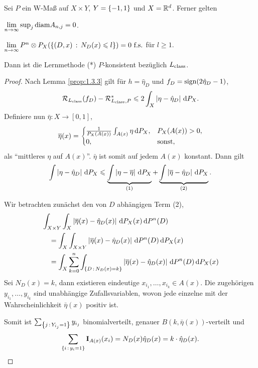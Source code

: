 \begin{prop}
\label{prop:1.3.4}
Sei $P$ ein W-Maß auf $X\times Y$, $Y=\left\{ -1,1 \right\}$ und $X=\mathbb{R}^d$. Ferner gelten
\begin{propenum}
\item $\lim\limits_{n\to\infty} \sup_j \mathrm{diam} A_{n,j} = 0$.
\item $\lim\limits_{n\to\infty} P^n\otimes P_X(\left\{ (D,x)\,:\,N_D(x)\leqslant l\right\}) =
0\ \text{f.s.}$ für $l\ge 1$.
\end{propenum}
Dann ist die Lernmethode (*) $P$-konsistent bezüglich $L_{\mathrm{class}}$.\fishhere
\end{prop}
\begin{proof}
Nach Lemma \ref{prop:1.3.3} gilt für $h=\hat{\eta}_D$ und
$f_D=\operatorname{sign}(2\hat{\eta}_D-1)$,
\begin{align*}
\mathcal{R}_{L_{\mathrm{class}}}(f_D) - \mathcal{R}_{L_{\mathrm{class}},P}^*
\leqslant 2\int_X \left|\eta-\hat\eta_D\right|\,\mathrm{d} P_X.
\end{align*}
Definiere nun $\bar{\eta}:X\to[0,1]$,
\begin{align*}
{\overline{\eta}}(x) =
\begin{cases}
\frac{1}{P_X(A(x))}\int_{A(x)} \eta \,\mathrm{d} P_X, & P_X(A(x)) > 0,\\
0, & \text{sonst},
\end{cases}
\end{align*}
als ``mittleres $\eta$ auf $A(x)$''. $\bar{\eta}$ ist somit auf jedem $A(x)$
konstant.
Dann gilt
\begin{align*}
\int \left|\eta-\hat{\eta}_D\right|\,\mathrm{d} P_X \leqslant
\underbrace{\int\left|\eta-{\overline{\eta}}\right|\,\mathrm{d} P_X}_{(1)}
+ \underbrace{\int \left|{\overline{\eta}}-\hat{\eta}_D\right|\,\mathrm{d} P_X}_{(2)}.
\end{align*}

Wir betrachten zunächst den von $D$ abhängigen Term (2),
\begin{align*}
&\int_{X\times Y} \int_X \left|{\overline{\eta}}(x)-\hat{\eta}_D(x)\right|\,\mathrm{d} P_X(x)\,\mathrm{d} P^n(D)\\
&\quad =
 \int_X\int_{X\times Y} \left|{\overline{\eta}}(x)-\hat{\eta}_D(x)\right|\,\mathrm{d} P^n(D)\,\mathrm{d} P_X(x)\\
&\quad=
 \int_X\sum_{k=0}^n \int_{\left\{ D\,:\,N_D(x)=k\right\}}
 \left|{\overline{\eta}}(x)-\hat{\eta}_D(x)\right|\,\mathrm{d} P^n(D)\,\mathrm{d} P_X(x)
\end{align*}
Sei $N_D(x)=k$, dann existieren eindeutige $x_{i_1},\ldots,x_{i_k}\in A(x)$.
Die zugehörigen $y_{i_1},\ldots,y_{i_k}$ sind unabhängige Zufallsvariablen,
wovon jede einzelne mit der Wahrscheinlichkeit $\bar{\eta}(x)$  positiv ist.

Somit ist $\sum_{\left\{ j\,:\,Y_{i_j}=1\right\}} y_{i_j}$ binomialverteilt, genauer
$B(k,\bar{\eta}(x))$-verteilt und
\begin{align*}
\sum_{\left\{ i\,:\,y_i=1\right\}}\mathbf{I}_{A(x)}(x_i) = N_D(x)\hat{\eta}_D(x) =
k\cdot\hat{\eta}_D(x).
\end{align*}


\end{proof}
